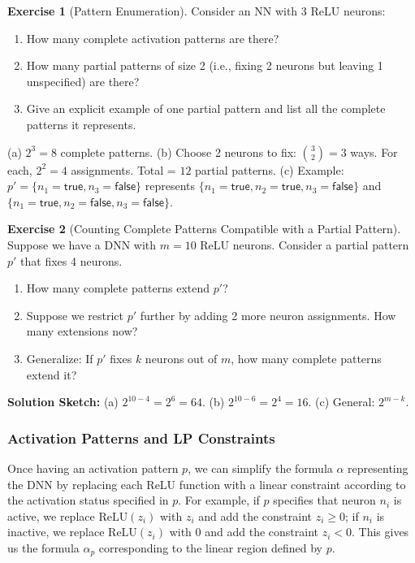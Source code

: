 \documentclass[oneside,11pt,dvipsnames]{book}
\numberwithin{equation}{section}
\theoremstyle{definition}
\newtheorem{exercise}{Exercise}[section]
\newtheorem{solutione}{Solution}[section]
\theoremstyle{remark}
\newenvironment{solution}{%
  \ifbool{showsol}{%
    \begin{solutione}%
  }{%
    \comment %
  }%
}{%
  \ifbool{showsol}{%
    \end{solutione}%
  }{%
    \endcomment %
  }%
}
\newcommand{\relu}[1]{\mathrm{ReLU}\left(#1\right)}
\begin{document}
\begin{exercise}[Pattern Enumeration]\label{exercise:pattern-enumeration}
Consider an NN with 3 ReLU neurons:
\begin{enumerate}
  \item How many complete activation patterns are there?
  \item How many partial patterns of size 2 (i.e., fixing 2 neurons but leaving 1 unspecified) are there?
  \item Give an explicit example of one partial pattern and list all the complete patterns it represents.
\end{enumerate}

\begin{solution}
(a) $2^3 = 8$ complete patterns.  
(b) Choose 2 neurons to fix: $\binom{3}{2}=3$ ways. For each, $2^2=4$ assignments. Total = $12$ partial patterns.  
(c) Example: $p'=\{n_1=\mathsf{true}, n_3=\mathsf{false}\}$ represents  
$\{n_1=\mathsf{true},n_2=\mathsf{true},n_3=\mathsf{false}\}$ and  
$\{n_1=\mathsf{true},n_2=\mathsf{false},n_3=\mathsf{false}\}$.  
\end{solution}
\end{exercise}


\begin{exercise}[Counting Complete Patterns Compatible with a Partial Pattern]
Suppose we have a DNN with $m=10$ ReLU neurons. Consider a partial pattern $p'$ that fixes 4 neurons.
\begin{enumerate}
  \item How many complete patterns extend $p'$?
  \item Suppose we restrict $p'$ further by adding 2 more neuron assignments. How many extensions now?
  \item Generalize: If $p'$ fixes $k$ neurons out of $m$, how many complete patterns extend it?
\end{enumerate}

\textbf{Solution Sketch:}  
(a) $2^{10-4}=2^6=64$.  
(b) $2^{10-6}=2^4=16$.  
(c) General: $2^{m-k}$.  
\end{exercise}

\subsubsection{Activation Patterns and LP Constraints}
Once having an activation pattern $p$, we can simplify the formula $\alpha$ representing the DNN by replacing each ReLU function with a linear constraint according to the activation status specified in $p$. For example, if $p$ specifies that neuron $n_i$ is active, we replace $\relu{z_i}$ with $z_i$ and add the constraint $z_i \ge 0$; if $n_i$ is inactive, we replace $\relu{z_i}$ with $0$ and add the constraint $z_i < 0$.
This gives us the formula $\alpha_p$ corresponding to the linear region defined by $p$.
\end{document}
